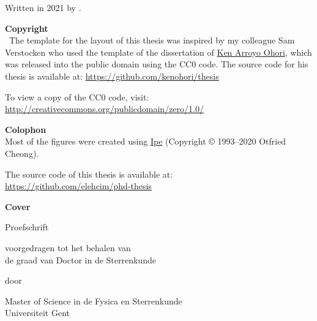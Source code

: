 
% 

\maketitle

\clearpage
\thispagestyle{empty}
\null%
\label{thesis:colophon}
\vfill
{}
Written in 2021 by
{\makeatletter{\@author}%
\makeatother}.

\textbf{Copyright}\\
\cczero\ The template for the layout of this thesis was inspired by my colleague Sam Verstocken who used the template of the dissertation of \href{ken.mx}{Ken Arroyo Ohori},
which was released into the public domain using the CC0 code. The source code for his thesis is available at: \url{https://github.com/kenohori/thesis}

To view a copy of the CC0 code, visit: \\
\url{http://creativecommons.org/publicdomain/zero/1.0/}


\textbf{Colophon} \\
Most of the figures were created using \href{http://ipe.otfried.org/}{Ipe} (Copyright © 1993–2020 Otfried Cheong).

The source code of this thesis is available at: \\
\url{https://github.com/elehcim/phd-thesis}

\textbf{Cover} \\

\begin{titlepage}
\null%
\label{thesis:title}
\vspace{3em}%
\begin{center}

\vspace*{4\baselineskip}

\makeatletter
{\huge\@title}
\makeatother
\vfill

{\Large Proefschrift}

\medskip

{voorgedragen tot het behalen van \\
de graad van
Doctor in de Sterrenkunde}


\medskip

door

\medskip

\makeatletter
{\Large \@author}
\makeatother

\medskip

Master of Science in de Fysica en  Sterrenkunde \\
Universiteit Gent

\end{center}
\end{titlepage}

